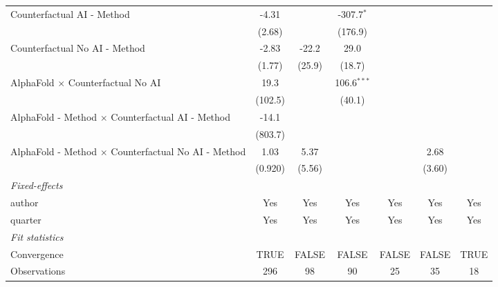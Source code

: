 \begin{tabular}{lcccccc}
   Counterfactual AI - Method                                 & -4.31       &              & -307.7$^{*}$  &         &              &   \\   
                                                              & (2.68)      &              & (176.9)       &         &              &   \\   
   Counterfactual No AI - Method                              & -2.83       & -22.2        & 29.0          &         &              &   \\   
                                                              & (1.77)      & (25.9)       & (18.7)        &         &              &   \\   
   AlphaFold $\times$ Counterfactual No AI                    & 19.3        &              & 106.6$^{***}$ &         &              &   \\   
                                                              & (102.5)     &              & (40.1)        &         &              &   \\   
   AlphaFold - Method $\times$ Counterfactual AI - Method     & -14.1       &              &               &         &              &   \\   
                                                              & (803.7)     &              &               &         &              &   \\   
   AlphaFold - Method $\times$ Counterfactual No AI - Method  & 1.03        & 5.37         &               &         & 2.68         &   \\   
                                                              & (0.920)     & (5.56)       &               &         & (3.60)       &   \\   
   \midrule
   \emph{Fixed-effects}\\
   author                                                     & Yes         & Yes          & Yes           & Yes     & Yes          & Yes\\  
   quarter                                                    & Yes         & Yes          & Yes           & Yes     & Yes          & Yes\\  
   \midrule
   \emph{Fit statistics}\\
   Convergence                                                &TRUE         & FALSE        & FALSE         & FALSE   & FALSE        & TRUE\\  
   Observations                                               & 296         & 98           & 90            & 25      & 35           & 18\\  

\end{tabular}
